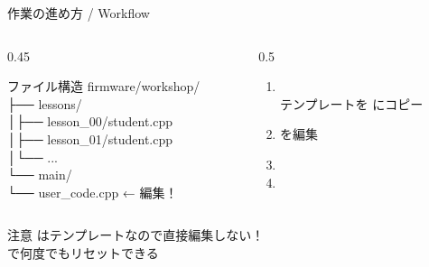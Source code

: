 \begin{frame}{作業の進め方 / Workflow}
  \begin{columns}[T]
    \begin{column}{0.45\textwidth}
      \begin{block}{ファイル構造}
        \footnotesize\ttfamily
        firmware/workshop/\\
        \hspace{1em}├── lessons/\\
        \hspace{1em}│\hspace{1em}├── lesson\_00/student.cpp\\
        \hspace{1em}│\hspace{1em}├── lesson\_01/student.cpp\\
        \hspace{1em}│\hspace{1em}└── ...\\
        \hspace{1em}└── main/\\
        \hspace{2.5em}└── user\_code.cpp ← 編集！
      \end{block}
    \end{column}
    \begin{column}{0.5\textwidth}
      \begin{enumerate}\setlength{\itemsep}{4pt}
        \item {}\\
              {\footnotesize テンプレートを  にコピー}
        \item {} を編集
        \item {}
        \item {}
      \end{enumerate}
    \end{column}
  \end{columns}

  \vspace{0.5em}

  \begin{alertblock}{注意}
     はテンプレートなので直接編集しない！\\
     で何度でもリセットできる
  \end{alertblock}
\end{frame}

